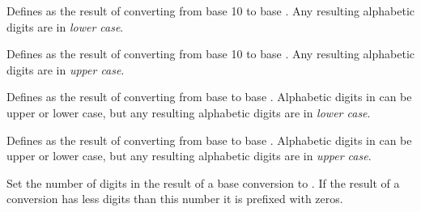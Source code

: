 \begin{command}{\pgfmathdectobase{}}
	Defines  as the result of converting  from
	base 10 to base . Any resulting alphabetic digits are in
	\emph{lower case}.
	
\begin{codeexample}[post=\tt\footnotesize\mynumber]
\pgfmathdectobase{}
\end{codeexample}

\end{command}

\begin{command}{\pgfmathdectoBase{}}
	Defines  as the result of converting  from
	base 10 to base . Any resulting alphabetic digits are in
	\emph{upper case}.
	
\begin{codeexample}[post=\tt\footnotesize\mynumber]
\pgfmathdectoBase{}
\end{codeexample}

\end{command}

\begin{command}{\pgfmathbasetobase{}}
	Defines  as the result of converting  from
	base  to base . Alphabetic digits in 
	 can be upper or lower case, but any resulting 
	alphabetic digits are in \emph{lower case}.
	
\begin{codeexample}[post=\tt\footnotesize\mynumber]
\pgfmathbasetobase{}
\end{codeexample}

\end{command}

\begin{command}{\pgfmathbasetoBase{}}
	Defines  as the result of converting  from
	base  to base . Alphabetic digits in 
	 can be upper or lower case, but any resulting 
	alphabetic digits are in \emph{upper case}.
	
\begin{codeexample}[post=\tt\footnotesize\mynumber]
\pgfmathbasetoBase{}
\end{codeexample}

\end{command}


\begin{command}{\pgfmathsetbasenumberlength{}}
	Set the number of digits in the result of a base conversion to 
	. If the result of a conversion has less digits
	than this number it is prefixed with zeros.

\begin{codeexample}[post=\tt\footnotesize\mynumber]
\pgfmathdectobase{}
\end{codeexample}

\end{command}